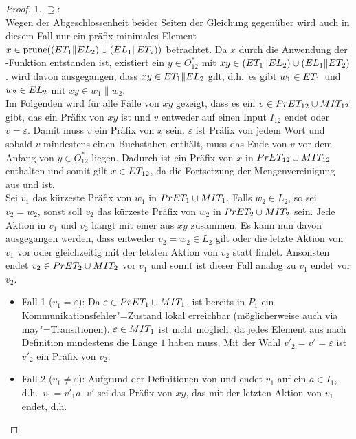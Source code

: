 \begin{proof}
  1. \glqq$\supseteq$\grqq{}:\\
  Wegen der Abgeschlossenheit beider Seiten der Gleichung gegenüber \cont{}
  wird auch in diesem Fall nur ein präfix-minimales Element $x\in\mathrm{prune} ((ET
  _1\|EL _2)\cup (EL _1\| ET _2))$ betrachtet. Da $x$ durch die Anwendung
  der \prune{}-Funktion entstanden ist, existiert ein $y\in O_{12} ^*$ mit
  $xy\in (ET _1\|EL _2)\cup (EL _1\| ET _2)$. \OBdA{} wird davon
  ausgegangen, dass $xy\in ET _1\| EL _2$ gilt, d.h.\ es gibt $w_1\in ET _1$
  und $w_2\in EL _2$ mit $xy \in w_1\| w_2$.\\
  Im Folgenden wird für alle Fälle von $xy$ gezeigt, dass es ein $v\in PrET
  _{12} \cup MIT _{12}$ gibt, das ein Präfix von $xy$ ist und $v$ entweder auf
  einen Input $I_{12}$ endet oder $v=\varepsilon$. Damit muss $v$ ein Präfix
  von $x$ sein. $\varepsilon$ ist Präfix von jedem Wort und sobald $v$
  mindestens einen Buchstaben enthält, muss das Ende von $v$ vor dem Anfang von
  $y\in O_{12}^*$ liegen. Dadurch ist ein Präfix von $x$ in $PrET _{12}\cup
  MIT _{12}$ enthalten und somit gilt $x\in ET _{12}$, da \ET{} die
  Fortsetzung der Mengenvereinigung aus \PrET{} und \MIT{} ist.\\
  Sei $v_1$ das kürzeste Präfix von $w_1$ in $PrET _1\cup MIT _1$. Falls $w_2
  \in L_2$, so sei $v_2=w_2$, sonst soll $v_2$ das kürzeste Präfix von $w_2$ in
  $PrET _2\cup MIT _2$ sein. Jede Aktion in $v_1$ und $v_2$ hängt mit einer
  aus $xy$ zusammen. Es kann nun davon ausgegangen werden, dass entweder $v_2 =
  w_2\in L_2$ gilt oder die letzte Aktion von $v_1$ vor oder gleichzeitig mit
  der letzten Aktion von $v_2$ statt findet. Ansonsten endet $v_2 \in PrET
  _2\cup MIT _2$ vor $v_1$ und somit ist dieser Fall analog zu $v_1$ endet vor
  $v_2$.
  \begin{itemize}
    \item Fall 1 ($v_1=\varepsilon$): Da $\varepsilon\in PrET _1\cup MIT _1$,
      ist bereits in $P_1$ ein Kommunikationsfehler"=Zustand lokal erreichbar
      (möglicherweise auch via may"=Transitionen). $\varepsilon \in MIT _1$
      ist nicht möglich, da jedes Element aus \MIT{} nach Definition mindestens
      die Länge $1$ haben muss. Mit der Wahl $v'_2=v'=\varepsilon$ ist $v'_2$
      ein Präfix von $v_2$.
    \item Fall 2 ($v_1\neq\varepsilon$): Aufgrund der Definitionen von \PrET{}
      und \MIT{} endet $v_1$ auf ein $a\in I_1$, d.h.\ $v_1=v'_1a$. $v'$ sei
      das Präfix von $xy$, das mit der letzten Aktion von $v_1$ endet, d.h.\

\end{itemize}
\end{proof}
